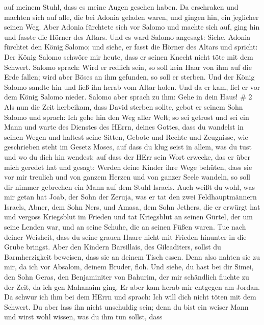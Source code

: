 auf meinem Stuhl, dass es meine Augen gesehen haben.  Da
erschraken und machten sich auf alle, die bei Adonia geladen waren, und
gingen hin, ein jeglicher seinen Weg.  Aber Adonia
fürchtete sich vor Salomo und machte sich auf, ging hin und fasste die
Hörner des Altars.  Und es ward Salomo angesagt: Siehe,
Adonia fürchtet den König Salomo; und siehe, er fasst die Hörner des
Altars und spricht: Der König Salomo schwöre mir heute, dass er seinen
Knecht nicht töte mit dem Schwert.  Salomo sprach: Wird er
redlich sein, so soll kein Haar von ihm auf die Erde fallen; wird aber
Böses an ihm gefunden, so soll er sterben.  Und der König
Salomo sandte hin und ließ ihn herab vom Altar holen. Und da er kam,
fiel er vor dem König Salomo nieder. Salomo aber sprach zu ihm: Gehe in
dein Haus! \# 2  Als nun die Zeit herbeikam, dass David
sterben sollte, gebot er seinem Sohn Salomo und sprach:  Ich
gehe hin den Weg aller Welt; so sei getrost und sei ein Mann
 und warte des Dienstes des HErrn, deines Gottes, dass du
wandelst in seinen Wegen und haltest seine Sitten, Gebote und Rechte und
Zeugnisse, wie geschrieben steht im Gesetz Moses, auf dass du klug seist
in allem, was du tust und wo du dich hin wendest;  auf dass
der HErr sein Wort erwecke, das er über mich geredet hat und gesagt:
Werden deine Kinder ihre Wege behüten, dass sie vor mir treulich und von
ganzem Herzen und von ganzer Seele wandeln, so soll dir nimmer gebrechen
ein Mann auf dem Stuhl Israels.  Auch weißt du wohl, was mir
getan hat Joab, der Sohn der Zeruja, was er tat den zwei
Feldhauptmännern Israels, Abner, dem Sohn Ners, und Amasa, dem Sohn
Jethers, die er erwürgt hat und vergoss Kriegsblut im Frieden und tat
Kriegsblut an seinen Gürtel, der um seine Lenden war, und an seine
Schuhe, die an seinen Füßen waren.  Tue nach deiner
Weisheit, dass du seine grauen Haare nicht mit Frieden hinunter in die
Grube bringst.  Aber den Kindern Barsillais, des
Gileaditers, sollst du Barmherzigkeit beweisen, dass sie an deinem Tisch
essen. Denn also nahten sie zu mir, da ich vor Absalom, deinem Bruder,
floh.  Und siehe, du hast bei dir Simei, den Sohn Geras, den
Benjaminiter von Bahurim, der mir schändlich fluchte zu der Zeit, da ich
gen Mahanaim ging. Er aber kam herab mir entgegen am Jordan. Da schwur
ich ihm bei dem HErrn und sprach: Ich will dich nicht töten mit dem
Schwert.  Du aber lass ihn nicht unschuldig sein; denn du
bist ein weiser Mann und wirst wohl wissen, was du ihm tun sollst, dass
